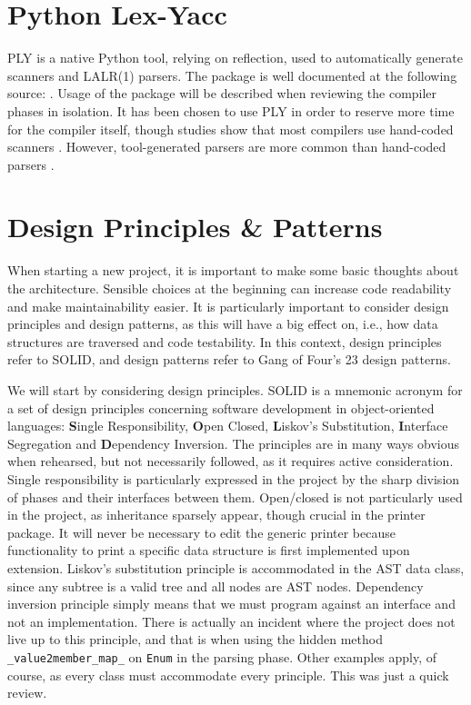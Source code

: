 \section{Python Lex-Yacc}
PLY is a native Python tool, relying on reflection, used to automatically generate scanners and LALR(1) parsers. The package is well documented at the following source: \cite{ply}. Usage of the package will be described when reviewing the compiler phases in isolation. It has been chosen to use PLY in order to reserve more time for the compiler itself, though studies show that most compilers use hand-coded scanners \parencite[69]{EnginneringACompiler}. However, tool-generated parsers are more common than hand-coded parsers \parencite[85]{EnginneringACompiler}.

\section{Design Principles \& Patterns}
When starting a new project, it is important to make some basic thoughts about the architecture. Sensible choices at the beginning can increase code readability and make maintainability easier. It is particularly important to consider design principles and design patterns, as this will have a big effect on, i.e., how data structures are traversed and code testability. In this context, design principles refer to SOLID, and design patterns refer to Gang of Four's 23 design patterns.

We will start by considering design principles. SOLID is a mnemonic acronym for a set of design principles concerning software development in object-oriented languages: \textbf{S}ingle Responsibility, \textbf{O}pen Closed, \textbf{L}iskov's Substitution, \textbf{I}nterface Segregation and \textbf{D}ependency Inversion. The principles are in many ways obvious when rehearsed, but not necessarily followed, as it requires active consideration. Single responsibility is particularly expressed in the project by the sharp division of phases and their interfaces between them. Open/closed is not particularly used in the project, as inheritance sparsely appear, though crucial in the printer package. It will never be necessary to edit the generic printer because functionality to print a specific data structure is first implemented upon extension. Liskov's substitution principle is accommodated in the AST data class, since any subtree is a valid tree and all nodes are AST nodes. Dependency inversion principle simply means that we must program against an interface and not an implementation. There is actually an incident where the project does not live up to this principle, and that is when using the hidden method \texttt{\_value2member\_map\_} on \texttt{Enum} in the parsing phase. Other examples apply, of course, as every class must accommodate every principle. This was just a quick review.

